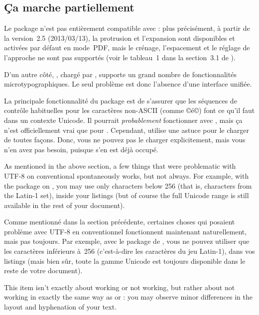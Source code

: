 \documentclass{lltxdoc}
\begin{document}
\subsection{Ça marche partiellement}\label{partial}

Le package  n'est pas entièrement compatible avec \luatex:
plus précisément, à partir de la version~2.5 (2013/03/13), la protrusion
et l'expansion sont disponibles et activées par défaut en mode~PDF, mais
le crénage, l'espacement et le réglage de l'approche ne sont pas supportés
(voir le tableau~1 dans la section~3.1 de ).

D'un autre côté, , chargé par , supporte un grand
nombre de fonctionnalités microtypographiques. Le seul problème est donc
l'absence d'une interface unifiée.

La principale fonctionnalité du package  est de s'assurer que les
séquences de contrôle habituelles pour les caractères non-ASCII (comme ©\'e©)
font ce qu'il faut dans un contexte Unicode. Il pourrait \emph{probablement}
fonctionner avec \luatex, mais ça n'est officiellement vrai que pour \xetex.
Cependant,  utilise une astuce pour le charger de toutes façons.
Donc, vous ne pouvez pas le charger explicitement, mais vous n'en avez pas besoin,
puisque  s'en est déjà occupé.

As mentioned in the above section, a few things that were problematic with
UTF-8 on conventional \latex spontaneously works, but not always. For example,
with the  package on \lualatex, you may use only characters below
256 (that is, characters from the Latin-1 set), inside your listings (but of
course the full Unicode range is still available in the rest of your document).

Comme mentionné dans la section précédente, certaines choses qui posaient problème avec UTF-8 en \latex conventionnel fonctionnent maintenant naturellement, mais pas toujours. Par exemple, avec le package  de \lualatex, vous ne pouvez utiliser que les caractères inférieurs à~256 (c'est-à-dire les caractères du jeu Latin-1), dans vos listings (mais bien sûr, toute la gamme Unicode est toujours disponible dans le reste de votre document).

This item isn't exactly about working or not working, but rather about not
working in exactly the same way as \pdftex or \xetex: you may observe minor
differences in the layout and hyphenation of your text.
\end{document}
